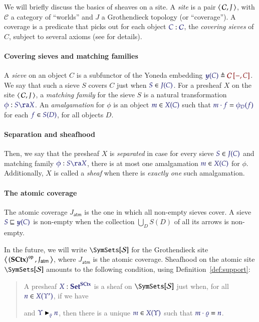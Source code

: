 \documentclass[11pt]{article}
\theoremstyle{definition}
\theoremstyle{remark}
\numberwithin{equation}{section}
\newcommand\SupportsUnmoded[3]{#1 \blacktriangleright_{#2} #3}
\newcommand\Supports[3]{\SupportsUnmoded{\IMode{#1}}{\IMode{#2}}{\IMode{#3}}}
\newcommand\SCtxSite{\SymSets[\Sorts]}
\begin{document}
We will briefly discuss the basics of sheaves on a site. A \emph{site} is a
pair $\left\langle\,\mathcal{C},J\,\right\rangle$, with $\mathcal{C}$ a category of ``worlds'' and
$J$ a Grothendieck topology (or ``coverage''). A coverage is a predicate that
picks out for each object $\Of{C}{\mathcal{C}}$, the \emph{covering sieves} of
$C$, subject to several axioms (see \cite{mac-lane-moerdijk:1992} for details).

\paragraph{Covering sieves and matching families}

A \emph{sieve} on an object $C$ is a subfunctor of the Yoneda embedding
$\Define{\Yoneda{C}}{\Hom{\mathcal{C}}{-}{C}}$. We say that such a sieve $S$
covers $C$ just when $\Member{S}{J(C)}$.  For a presheaf $X$ on the site
$\left\langle\,\mathcal{C},J\,\right\rangle$, a \emph{matching family} for the sieve $S$ is a
natural transformation $\Of{\phi}{S\ra X}$. An \emph{amalgamation} for $\phi$
is an object $\Member{m}{X(C)}$ such that $\IsEq{m\cdot f}{\phi_D(f)}$ for each
$\Member{f}{S(D)}$, for all objects $D$.

\paragraph{Separation and sheafhood}
Then, we say that the presheaf $X$ is \emph{separated} in case for every sieve
$\Member{S}{J(C)}$ and matching family $\Of{\phi}{S\ra X}$, there is at most
one amalgamation $\Member{m}{X(C)}$ for $\phi$. Additionally, $X$ is called a
\emph{sheaf} when there is \emph{exactly one} such amalgamation.

\paragraph{The atomic coverage}

The atomic coverage $J_\mathsf{atm}$ is the one in which all non-empty sieves
cover. A sieve $\IMode{S}\sqsubseteq\IMode{\Yoneda{C}}$ is non-empty when the
collection $\bigcup_D S(D)$ of all its arrows is non-empty.

In the future, we will write $\SCtxSite$ for the Grothendieck site
$\left\langle\,\left(\mathbf{SCtx}\right)^{\mathtt{op}},J_\mathsf{atm}\,\right\rangle$, where $J_\mathsf{atm}$ is
the atomic coverage. Sheafhood on the atomic site $\SCtxSite$ amounts to the
following condition, using Definition~\ref{def:support}:
\begin{quote}
  A presheaf $\Of{X}{\Sets^\SCtx}$ is a sheaf on $\SCtxSite$ just when, for all $\Member{n}{X(\Upsilon')}$, if we have
  and $\Supports{\Upsilon}{\varrho}{n}$, then there is a unique
  $\Member{m}{X(\Upsilon)}$ such that $\IsEq{m\cdot\varrho}{n}$.
\end{quote}
\end{document}
